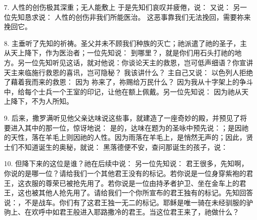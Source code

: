 7. 人性的创伤极其深重；无人能敷上 于是先知们哀叹并疲倦，说： 又说： 另一位先知恳求说： 人性的创伤非我们所能医治。 这恶事靠我们无法挽回，需要祢来挽回它。\par

8. 主垂听了先知的祈祷。圣父并未不顾我们种族的灭亡；祂派遣了祂的圣子，主从天上降下，作为医治者；一位先知说： 到哪里？，就是你们用石头打祂的地方。另一位先知听见这话，就对他说：你谈论天主的救恩，岂可低声细语？你宣讲天主来临施行救恩的喜讯，岂可隐秘？ 我该讲什么？ 主自己又说： 以色列人拒绝了藉着我而来的救恩： 因为 祢来了，祢赐给万民什么？ 因为我从十字架上的争斗中，给每个士兵一个王室的印记，让他在额上佩戴。另一位先知说： 因为祂从天上降下，不为人所知。\par

9. 后来，撒罗满听见他父亲达味说这些事，就建造了一座奇妙的殿，并预见了将要进入其中的那一位，惊讶地说： 是的，达味在题为的圣咏中预先说：；是因祂的天性，落在羊毛上则因祂的人性。因为雨落在羊毛上，是悄然无声的；因此，贤士们不知道诞生的奥秘，就说： 黑落德便不安，查问那诞生的孩子，说：\par

10. 但降下来的这位是谁？祂在后续中说： 另一位先知说： 君王很多，先知啊，你说的是哪一位？请给我们一个其他君王没有的标记。若你说是一位身穿紫袍的君王，这衣服的尊荣已被抢先用了。若你说是一位由持矛者护卫、坐在金车上的君王，这也被其他人抢先用了。请给我们一个你所宣布的君王独有的标记。先知回答说：，不是战车。你们有了这君王独一无二的标记。耶稣是唯一骑在未经驯服的驴驹上、在欢呼中如君王般进入耶路撒冷的君王。当这位君王来了，祂做什么？\par

